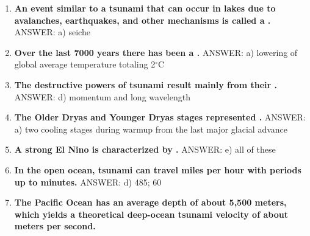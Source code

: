 \documentclass[10pt]{article}
\newcommand{\Rivpt}{\rule{.1pt}{1pt}}
\begin{document}
\begin{enumerate}
\item {
\setlength{\itemsep}{0cm}
\setlength{\parskip}{.2cm}
\begin{samepage}
\textbf{
An event similar to a tsunami that can occur in lakes due to avalanches, earthquakes, and other mechanisms is called a \makebox[1cm]{\Rivpt\hrulefill\Rivpt}.
}
ANSWER: a)	seiche
\end{samepage}
}
\item {
\setlength{\itemsep}{0cm}
\setlength{\parskip}{.2cm}
\begin{samepage}
\textbf{
Over the last 7000 years there has been a \makebox[1cm]{\Rivpt\hrulefill\Rivpt}.
}
ANSWER: a) lowering of global average temperature totaling 2\ensuremath{^\circ}C
\end{samepage}
}
\item {
\setlength{\itemsep}{0cm}
\setlength{\parskip}{.2cm}
\begin{samepage}
\textbf{
The destructive powers of tsunami result mainly from their \makebox[1cm]{\Rivpt\hrulefill\Rivpt}.
}
ANSWER: d)	momentum and long wavelength
\end{samepage}
}
\item {
\setlength{\itemsep}{0cm}
\setlength{\parskip}{.2cm}
\begin{samepage}
\textbf{
The Older Dryas and Younger Dryas stages represented \makebox[1cm]{\Rivpt\hrulefill\Rivpt}.
}
ANSWER: a) two cooling stages during warmup from the last major glacial advance
\end{samepage}
}
\item {
\setlength{\itemsep}{0cm}
\setlength{\parskip}{.2cm}
\begin{samepage}
\textbf{
A strong El Nino is characterized by \makebox[1cm]{\Rivpt\hrulefill\Rivpt}.
}
ANSWER: e) all of these
\end{samepage}
}
\item {
\setlength{\itemsep}{0cm}
\setlength{\parskip}{.2cm}
\begin{samepage}
\textbf{
In the open ocean, tsunami can travel \makebox[1cm]{\Rivpt\hrulefill\Rivpt} miles per hour with periods up to \makebox[1cm]{\Rivpt\hrulefill\Rivpt} minutes.
}
ANSWER: d)	485; 60
\end{samepage}
}
\item {
\setlength{\itemsep}{0cm}
\setlength{\parskip}{.2cm}
\begin{samepage}
\textbf{
The Pacific Ocean has an average depth of about 5,500 meters, which yields a theoretical deep-ocean tsunami velocity of about \makebox[1cm]{\Rivpt\hrulefill\Rivpt} meters per second.
}
\end{samepage}}
\end{enumerate}
\end{document}
